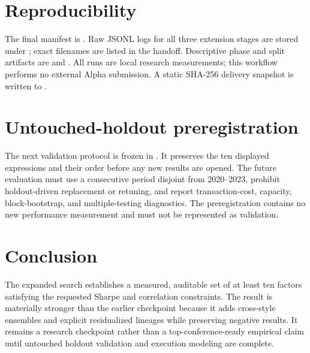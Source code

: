 \documentclass[10pt,a4paper]{article}
\begin{document}
\section{Reproducibility}
The final manifest is . Raw JSONL logs for all three extension stages are
stored under ; exact filenames are listed in the handoff. Descriptive phase and
split artifacts are  and .
All runs are local research measurements; this workflow performs no external Alpha submission. A static
SHA-256 delivery snapshot is written to
.

\section{Untouched-holdout preregistration}
The next validation protocol is frozen in . It preserves the ten
displayed expressions and their order before any new results are opened. The future evaluation must use a
consecutive period disjoint from 2020--2023, prohibit holdout-driven replacement or retuning, and report
transaction-cost, capacity, block-bootstrap, and multiple-testing diagnostics. The preregistration contains no
new performance measurement and must not be represented as validation.

\section{Conclusion}
The expanded search establishes a measured, auditable set of at least ten factors satisfying the requested
Sharpe and correlation constraints. The result is materially stronger than the earlier checkpoint because it
adds cross-style ensembles and explicit residualized lineages while preserving negative results. It remains a
research checkpoint rather than a top-conference-ready empirical claim until untouched holdout validation and
execution modeling are complete.
\end{document}
